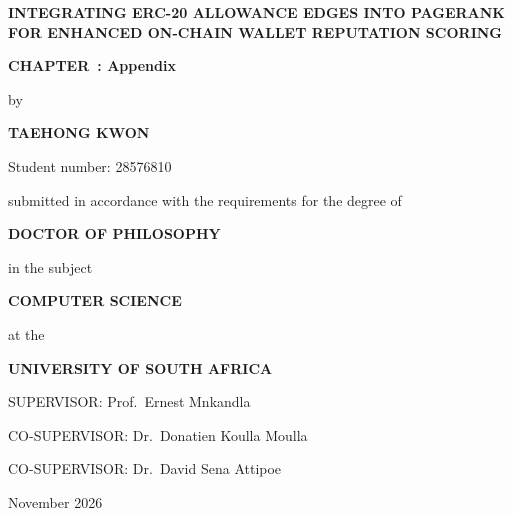 \ifcase\ChapterOnly\relax
\or
  \def\ChapterCoverTitle{Introduction and Research Problem}%
\or
  \def\ChapterCoverTitle{Literature Review and Theoretical Framework}%
\or
  \def\ChapterCoverTitle{Research Methodology}%
\or
  \def\ChapterCoverTitle{Implementation and Empirical Results}%
\or
  \def\ChapterCoverTitle{Discussion}%
\or
  \def\ChapterCoverTitle{Conclusion and Future Work}%
\or
  \def\ChapterCoverTitle{References}%
\or
  \def\ChapterCoverTitle{Appendix}%
\fi

\begin{titlepage}
\centering
\vspace*{0.4cm}
{\Large\bfseries INTEGRATING ERC-20 ALLOWANCE EDGES INTO PAGERANK FOR ENHANCED ON-CHAIN WALLET REPUTATION SCORING\par}
\vspace{1.2cm}
{\large\bfseries CHAPTER~\ChapterOnly: \ChapterCoverTitle\par}
\vfill
{by\par}
\vspace{0.7cm}
{\large\bfseries TAEHONG KWON\par}
\vspace{0.35cm}
{Student number: 28576810\par}
\vfill
{submitted in accordance with the requirements for the degree of\par}
\vspace{0.7cm}
{\large\bfseries DOCTOR OF PHILOSOPHY\par}
\vspace{0.35cm}
{in the subject\par}
\vspace{0.7cm}
{\large\bfseries COMPUTER SCIENCE\par}
\vfill
{at the\par}
\vspace{0.7cm}
{\large\bfseries UNIVERSITY OF SOUTH AFRICA\par}
\vfill
{SUPERVISOR: Prof.~Ernest Mnkandla\par}
\vspace{0.35cm}
{CO-SUPERVISOR: Dr.~Donatien Koulla Moulla\par}
\vspace{0.35cm}
{CO-SUPERVISOR: Dr.~David Sena Attipoe\par}
\vfill
{November 2026\par}
\end{titlepage}
\restoregeometry
\ifdefined\ChapterStartPage
  \setcounter{page}{\ChapterStartPage}%
\fi
